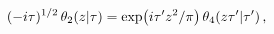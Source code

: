 \[(-i\tau)^{1/2}\mathop{\theta_{2}\/}\nolimits\!\left(z\middle|\tau\right)=%
\mathop{\exp\/}\nolimits\!\left(i\tau^{\prime}z^{2}/\pi\right)\mathop{\theta_{%
4}\/}\nolimits\!\left(z\tau^{\prime}\middle|\tau^{\prime}\right),\]